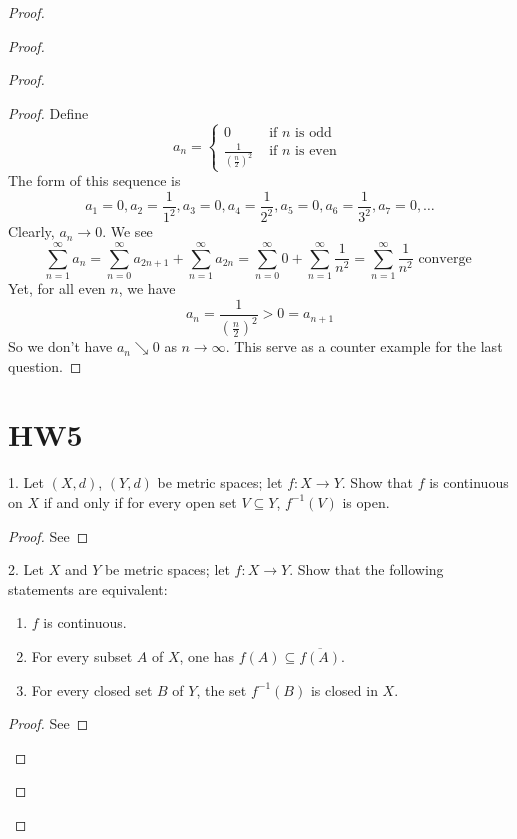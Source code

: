 \documentclass{report}
\begin{document}
\begin{proof}
\begin{proof}
\begin{proof}
\begin{proof}
Define
\begin{equation}
a_n=\begin{cases}
 0& \text{ if $n$ is odd }\\
 \frac{1}{(\frac{n}{2})^2}& \text{ if $n$ is even }
\end{cases}
\end{equation}
The form of this sequence is
\begin{equation}
a_1=0,a_2=\frac{1}{1^2},a_3=0,a_4=\frac{1}{2^2},a_5=0,a_6=\frac{1}{3^2},a_7=0,\dots 
\end{equation}
Clearly, $a_n\to 0$. We see
\begin{equation}
\sum_{n=1}^\infty a_n=\sum_{n=0}^\infty a_{2n+1}+\sum_{n=1}^\infty a_{2n}=\sum_{n=0}^\infty 0+\sum_{n=1}^\infty \frac{1}{n^2}=\sum_{n=1}^\infty \frac{1}{n^2}\text{ converge }
\end{equation}
Yet, for all even  $n$, we have
 \begin{equation}
a_n=\frac{1}{(\frac{n}{2})^2}>0=a_{n+1}
\end{equation}
So we don't have $a_n\searrow 0$ as  $n\to\infty$. This serve as a counter example for the last question.
\end{proof}
\section{HW5}

\begin{question}{}{}
1. Let \((X, d)\), \((Y, d)\) be metric spaces; let \(f : X \rightarrow Y\). Show that \(f\) is continuous on \(X\) if and
only if for every open set \(V\subseteq Y\), \(f^{-1}(V)\) is open.
\end{question}
\begin{proof}
See 
\end{proof}

\begin{question}{}{}

2. Let \(X\) and \(Y\) be metric spaces; let \(f : X \rightarrow Y\). Show that the following statements are
equivalent:

\begin{enumerate}
    \item \(f\) is continuous.
    \item For every subset \(A\) of \(X\), one has \(f(A) \subseteq \overline{f(A)}\).
    \item For every closed set \(B\) of \(Y\), the set \(f^{-1}(B)\) is closed in \(X\).
\end{enumerate}
\end{question}
\begin{proof}
See 
\end{proof}


\end{proof}
\end{proof}
\end{proof}
\end{document}
